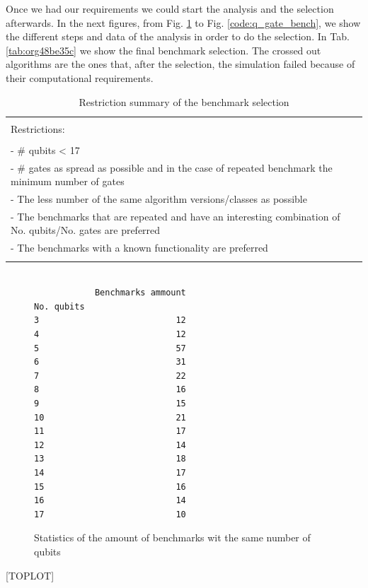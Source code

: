 Once we had our requirements we could start the analysis and the selection afterwards.
In the next figures, from Fig. \ref{code:no_q_statistics} to Fig. \ref{code:q_gate_bench}, we show the different steps and data of the analysis in order to do the selection.
In Tab. \ref{tab:org48be35c} we show the final benchmark selection.
The crossed out algorithms are the ones that, after the selection, the simulation failed because of their computational requirements.
\begin{table}[htbp]
\caption{\label{tab:org7d07c42}
Restriction summary of the benchmark selection}
\centering
\begin{tabular}{|l|}
\hline
\\
Restrictions:\\
\\
- \# qubits < 17\\
- \# gates as spread as possible and in the case of repeated benchmark the minimum number of gates\\
- The less number of the same algorithm versions/classes as possible\\
- The benchmarks that are repeated and have an interesting combination of No. qubits/No. gates are  preferred\\
- The benchmarks with a known functionality are preferred\\
\\
\hline
\end{tabular}
\end{table}

\begin{figure}
\centering

\begin{verbatim}

            Benchmarks ammount
No. qubits
3                           12
4                           12
5                           57
6                           31
7                           22
8                           16
9                           15
10                          21
11                          17
12                          14
13                          18
14                          17
15                          16
16                          14
17                          10

\end{verbatim}


\label{code:no_q_statistics}
\caption{Statistics of the amount of benchmarks wit the same number of qubits}
\end{figure}
[TOPLOT]

